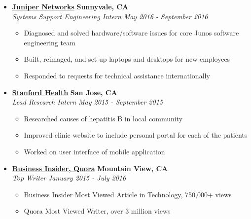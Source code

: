\documentclass[10pt,letterpaper]{article}
\begin{document}
\begin{itemize}
    \item[]
    {\href{https://www.juniper.net/us/en/}{\textbf{Juniper Networks}} \hfill
      \textbf{Sunnyvale, CA}}
    \\
    {\emph{Systems Support Engineering Intern} \hfill \emph{May 2016 - September 2016}}

    \begin{itemize}[label=\textbullet]
      \itemsep0em
      \item Diagnosed and solved hardware/software issues for core Junos software engineering team
      \item Built, reimaged, and set up laptops and desktops for new employees
      \item Responded to requests for technical assistance internationally
    \end{itemize}

    \item[]
    {\href{https://stanfordhealthcare.org/}{\textbf{Stanford Health}} \hfill
      \textbf{San Jose, CA}}
    \\
    {\emph{Lead Research Intern} \hfill \emph{May 2015 - September 2015}}

    \begin{itemize}[label=\textbullet]
      \itemsep0em
      \item Researched causes of hepatitis B in local community
      \item Improved clinic website to include personal portal for each of the patients
      \item Worked on user interface of mobile application
    \end{itemize}


    \item[]
    {\href{http://www.businessinsider.com/}{\textbf{Business Insider, Quora}} \hfill
      \textbf{Mountain View, CA}}
    \\
    {\emph{Top Writer} \hfill \emph{January 2015 - July 2016}}

    \begin{itemize}[label=\textbullet]
      \itemsep0em
      \item Business Insider Most Viewed Article in Technology, 750,000+ views
      \item Quora Most Viewed Writer, over 3 million views
    \end{itemize}
  \end{itemize}
\end{document}

